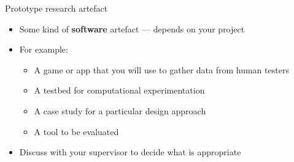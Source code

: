 \begin{frame}{Prototype research artefact}
	\begin{itemize}
		\pause\item Some kind of \textbf{software} artefact --- depends on your project
		\pause\item For example:
			\begin{itemize}
				\pause\item A game or app that you will use to gather data from human testers
				\pause\item A testbed for computational experimentation
				\pause\item A case study for a particular design approach
				\pause\item A tool to be evaluated
			\end{itemize}
		\pause\item Discuss with your supervisor to decide what is appropriate
	\end{itemize}
\end{frame}

